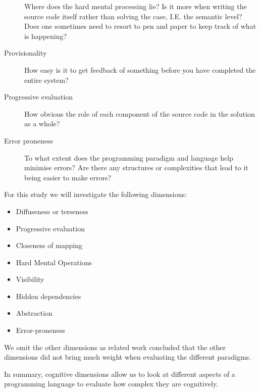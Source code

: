 \begin{description}
Where does the hard mental processing lie? Is it more when writing the source
code itself rather than solving the case, I.E. the semantic level? Does one
sometimes need to resort to pen and paper to keep track of what is happening?

\item[ Provisionality ]

How easy is it to get feedback of something before you have completed the entire
system?

\item[ Progressive evaluation ]

How obvious the role of each component of the source code in the solution as a
whole?

\item[ Error proneness ]

To what extent does the programming paradigm and language help minimise errors? Are
there any structures or complexities that lead to it being easier to make
errors?
\end{description}

\noindent For this study we will investigate the following dimensions: 

\begin{itemize}
    \item Diffuseness or terseness
    \item Progressive evaluation
    \item Closeness of mapping
    \item Hard Mental Operations
    \item Visibility
    \item Hidden dependencies
    \item Abstraction
    \item Error-proneness 
\end{itemize}

\noindent We omit the other dimensions as related work concluded that the other
dimensions did not bring much weight when evaluating the different
paradigms.~\cite{euguenkiss}

In summary, cognitive dimensions allow us to look at different aspects of a
programming language to evaluate how complex they are cognitively. 

